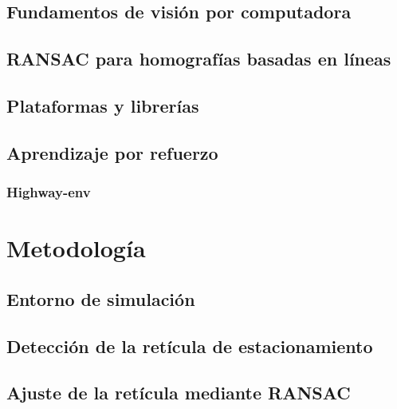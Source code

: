 \documentclass[10pt,letterpaper,final]{report}
\newlength{\spacing}
\newcommand{\nspace}[1]{\setlength{\baselineskip}{#1\spacing}}
\newenvironment{linespacing}[1]{\nspace{#1}}{}
\begin{document}
\begin{linespacing}{1.5}
\section{Fundamentos de visión por computadora}\label{sec:vision}


\section{RANSAC para homografías basadas en líneas}\label{sec:ransac-teorico}


\section{Plataformas y librerías}\label{sec:plataformas}


\section{Aprendizaje por refuerzo}


\subsection{Highway-env}


\clearpage
\chapter{Metodología}\label{chap:metodologia}


\section{Entorno de simulación}\label{sec:carla}


\section{Detección de la retícula de estacionamiento}\label{sec:metodo-reticula}


\section{Ajuste de la retícula mediante RANSAC}\label{sec:metodo-ransac}



\end{linespacing}
\end{document}
